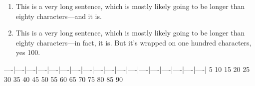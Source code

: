 \begin{enumerate}
  \item This is a very long sentence, which is mostly likely going to be longer than
        eighty characters---and it is.
  \item This is a very long sentence, which is mostly likely going to be longer than
        eighty characters---in fact, it is. But it's wrapped on one hundred characters,
        yes 100.
\end{enumerate}
----|----|----|----|----|----|----|----|----|----|----|----|----|----|----|----|----|----|
   5   10   15   20   25   30   35   40   45   50   55   60   65   70   75   80   85   90